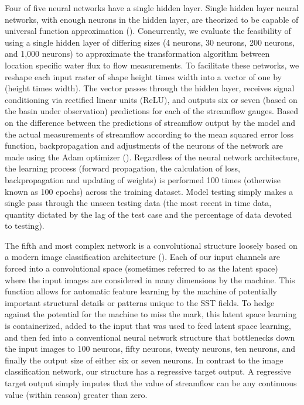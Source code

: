 \begin{refsection}
Four of five neural networks have a single hidden layer. Single hidden layer neural networks, with enough neurons in the hidden layer, are theorized to be capable of universal function approximation (\cite{hornik1989multilayer}). Concurrently, we evaluate the feasibility of using a single hidden layer of differing sizes (4 neurons, 30 neurons, 200 neurons, and 1,000 neurons) to approximate the transformation algorithm between location specific water flux to flow measurements. To facilitate these networks, we reshape each input raster of shape height times width into a vector of one by (height times width). The vector passes through the hidden layer, receives signal conditioning via rectified linear units (ReLU), and outputs six or seven (based on the basin under observation) predictions for each of the streamflow gauges. Based on the difference between the predictions of streamflow output by the model and the actual measurements of streamflow according to the mean squared error loss function, backpropagation and adjustments of the neurons of the network are made using the Adam optimizer (\cite{kingma2014adam}). Regardless of the neural network architecture, the learning process (forward propagation, the calculation of loss, backpropagation and updating of weights) is performed 100 times (otherwise known as 100 epochs) across the training dataset. Model testing simply makes a single pass through the unseen testing data (the most recent in time data, quantity dictated by the lag of the test case and the percentage of data devoted to testing).

The fifth and most complex network is a convolutional structure loosely based on a modern image classification architecture (\cite{he2016deep}). Each of our input channels are forced into a convolutional space (sometimes referred to as the latent space) where the input images are considered in many dimensions by the machine. This function allows for automatic feature learning by the machine of potentially important structural details or patterns unique to the SST fields. To hedge against the potential for the machine to miss the mark, this latent space learning is containerized, added to the input that was used to feed latent space learning, and then fed into a conventional neural network structure that bottlenecks down the input images to 100 neurons, fifty neurons, twenty neurons, ten neurons, and finally the output size of either six or seven neurons. In contrast to the image classification network, our structure has a regressive target output. A regressive target output simply imputes that the value of streamflow can be any continuous value (within reason) greater than zero. 



\end{refsection}
